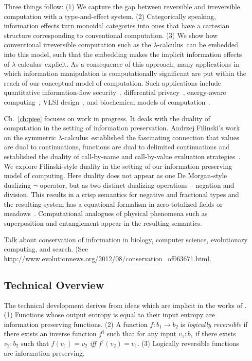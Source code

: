 \documentclass{article}
\newcommand{\lcal}{\ensuremath{\lambda}-calculus}
\begin{document}
Three things follow: (1) We capture the gap between reversible and
irreversible computation with a type-and-effect system. (2)
Categorically speaking, information effects turn monoidal categories
into ones that have a cartesian structure corresponding to
conventional computation.  (3) We show how conventional irreversible
computation such as the \lcal\ can be embedded into this model, such
that the embedding makes the implicit information effects of \lcal\
explicit.  As a consequence of this approach, many applications in
which information manipulation is computationally significant are put
within the reach of our conceptual model of computation. Such
applications include quantitative information-flow
security~\cite{myerssab}, differential
privacy~\cite{dwork:differential}, energy-aware
computing~\cite{1324180,605411}, VLSI
design~\cite{Macii:1996:ECE:874066.875828}, and biochemical models of
computation~\cite{bio}. 

Ch.~\ref{ch:piee} focuses on work in progress. It deals with the
duality of computation in the setting of information
preservation. Andrzej Filinski's work on the symmetric
\lcal\ established the fascinating connection that values are dual to
continuations, functions are dual to delimited continuations and
established the duality of call-by-name and call-by-value evaluation
strategies~\cite{Filinski:1989:DCI:648332.755574}. We explore
Filinski-style duality in the setting of our information preserving
model of computing. Here duality does not appear as one De
Morgan-style dualizing $\neg$ operator, but as two distinct dualizing
operations -- negation and division. This results in a crisp semantics
for negative and fractional types and the resulting system has a
equational formalism in zero-totalized fields or
meadows~\cite{DBLP:journals/tcs/BergstraHT09}. Computational analogues
of physical phenomena such as superposition and entanglement appear in
the resulting semantics.

Talk about conservation of information in biology, computer science,
evolutionary computing, and search. (See
\url{http://www.evolutionnews.org/2012/08/conservation_of063671.html}.

\subsection{Technical Overview}

The technical development derives from ideas which are implicit in the
works of \cite{Toffoli:1980, Zuliani:2001:LR,
  malacaria2007assessing,ClarkHM07,Ghica:2007:GSS:1190216.1190269}.
(1) Functions whose output entropy is equal to their input entropy are
information preserving functions.  (2) A function
$f : b_1 \rightarrow b_2$ is \emph{logically reversible} if there
exists an inverse function $f^{\dagger}$ such that for any input
$v_1:b_1$ if there exists $v_2:b_2$ such that $f(v_1)=v_2$ \emph{iff}
$f^{\dagger}(v_2)=v_1$.  (3) Logically reversible functions are
information preserving.
\end{document}

